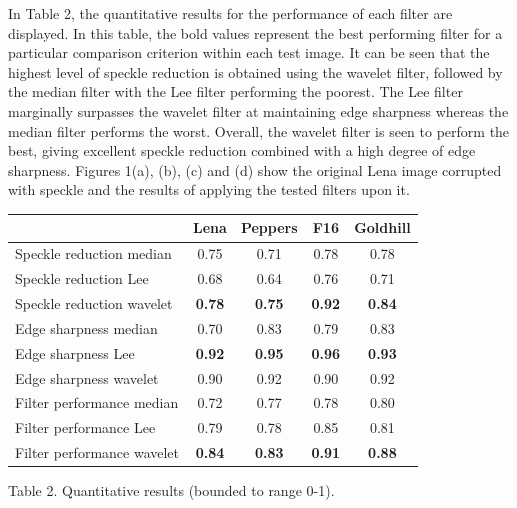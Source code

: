 \documentclass[twocolumn]{article}
\begin{document}
In Table 2, the quantitative results for the performance of each filter are displayed. In this table,
the bold values represent the best performing filter for a particular comparison criterion within each test image.
It can be seen that the highest level of speckle reduction is obtained using the wavelet filter, followed
by the median filter with the Lee filter performing the poorest. 
The Lee filter marginally surpasses the wavelet filter at maintaining edge sharpness whereas the median filter performs 
the worst.
Overall, the wavelet filter is seen to perform the best, giving excellent speckle reduction combined with 
a high degree of edge sharpness. Figures 1(a), (b), (c) and (d)
show the original Lena image corrupted with speckle and the results of applying the tested filters upon it.

\begin{table}[ht]
\begin{center}
\begin{footnotesize}
\begin{tabular}{|l|c|c|c|c|} \hline
				& Lena 		& Peppers 	& F16 		& Goldhill 	\\ \hline \hline
Speckle reduction median	& 0.75		& 0.71		& 0.78		& 0.78		\\ \hline
Speckle reduction Lee		& 0.68		& 0.64		& 0.76		& 0.71		\\ \hline
Speckle reduction wavelet	& {\bf 0.78}	& {\bf 0.75}	& {\bf 0.92}	& {\bf 0.84}	\\ \hline \hline
Edge sharpness median		& 0.70		& 0.83		& 0.79		& 0.83		\\ \hline
Edge sharpness Lee		& {\bf 0.92}	& {\bf 0.95}	& {\bf 0.96}	& {\bf 0.93}	\\ \hline
Edge sharpness wavelet		& 0.90		& 0.92		& 0.90		& 0.92		\\ \hline \hline
Filter performance median	& 0.72		& 0.77		& 0.78		& 0.80		\\ \hline
Filter performance Lee		& 0.79		& 0.78		& 0.85		& 0.81		\\ \hline
Filter performance wavelet	& {\bf 0.84}	& {\bf 0.83}	& {\bf 0.91}	& {\bf 0.88}	\\ \hline
\end{tabular}
\end{footnotesize}
\end{center}
\begin{minipage}[h]{8.3cm}
	{\begin{center} Table 2. Quantitative results (bounded to range 0-1). \end{center}} 
\end{minipage}
\end{table}
\end{document}
